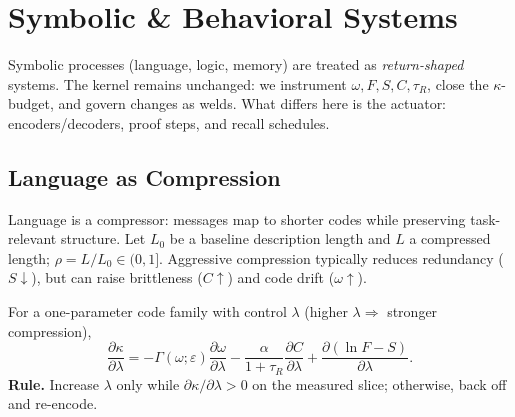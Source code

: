 \chapter{Symbolic \& Behavioral Systems}
\label{ch:symbolic}

Symbolic processes (language, logic, memory) are treated as \emph{return-shaped} systems. The kernel remains unchanged: we instrument \(\omega,F,S,C,\tau_{R}\), close the \(\kappa\)-budget, and govern changes as welds. What differs here is the actuator: encoders/decoders, proof steps, and recall schedules.

\section{Language as Compression}
\label{sec:language-compression}

Language is a compressor: messages map to shorter codes while preserving task-relevant structure.
Let \(L_0\) be a baseline description length and \(L\) a compressed length; \(\rho=L/L_0\in(0,1]\).
Aggressive compression typically reduces redundancy (\(S\!\downarrow\)), but can raise brittleness (\(C\!\uparrow\)) and code drift (\(\omega\!\uparrow\)).

\begin{eqbox}
For a one-parameter code family with control \(\lambda\) (higher \(\lambda\Rightarrow\) stronger compression),
\[
\frac{\partial \kappa}{\partial \lambda}
= -\Gamma(\omega;\varepsilon)\frac{\partial \omega}{\partial \lambda}
  - \frac{\alpha}{1+\tau_R}\frac{\partial C}{\partial \lambda}
  + \frac{\partial(\ln F - S)}{\partial \lambda}.
\]
\textbf{Rule.} Increase \(\lambda\) only while \(\partial \kappa/\partial \lambda>0\) on the measured slice; otherwise, back off and re-encode.
\end{eqbox}

